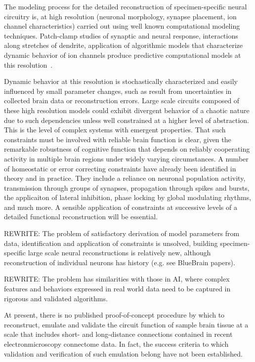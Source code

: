 \documentclass{ldr-article}
\begin{document}
The modeling process for the detailed reconstruction of specimen-specific neural circuitry is, at high resolution (neuronal morphology, synapse placement, ion channel characteristics) carried out using well known computational modeling techniques. Patch-clamp studies of synaptic and neural response, interactions along stretches of dendrite, application of algorithmic models that characterize dynamic behavior of ion channels produce predictive computational models at this resolution~\cite{markram2015}. 

Dynamic behavior at this resolution is stochastically characterized and easily influenced by small parameter changes, such as result from uncertainties in collected brain data or reconstruction errors. Large scale circuits composed of these high resolution models could exhibit divergent behavior of a chaotic nature due to such dependencies unless well constrained at a higher level of abstraction. This is the level of complex systems with emergent properties. That such constraints must be involved with reliable brain function is clear, given the remarkable robustness of cognitive function that depends on reliably cooperating activity in multiple brain regions under widely varying circumstances. A number of homeostatic or error correcting constraints have already been identified in theory and in practice. They include a reliance on neuronal population activity, transmission through groups of synapses, propagation through spikes and bursts, the applicaiton of lateral inhibition, phase locking by global modulating rhythms, and much more. A sensible application of constraints at successive levels of a detailed functional reconstruction will be essential.

\alert{REWRITE}:
The problem of satisfactory derivation of model parameters from data, identification and application of constraints is unsolved, building specimen-specific large scale neural reconstructions is relatively new, although reconstruction of individual neurons has history (e.g. see BlueBrain papers).

\alert{REWRITE}:
The problem has similarities with those in AI, where complex features and behaviors expressed in real world data need to be captured in rigorous and validated algorithms.

At present, there is no published proof-of-concept procedure by which to reconstruct, emulate and validate the circuit function of sample brain tissue at a scale that includes short- and long-distance connections contained in recent electronmicroscopy connectome data. In fact, the success criteria to which validation and verification of such emulation belong have not been established. 
\end{document}

